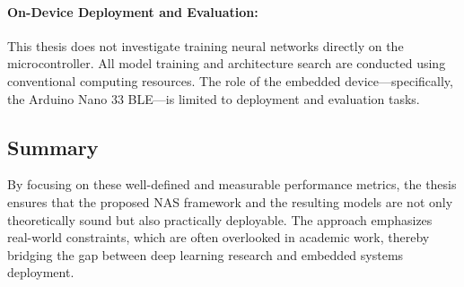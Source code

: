 \paragraph{\textbf{On-Device Deployment and Evaluation}:}
This thesis does not investigate training neural networks directly on the microcontroller. All model training and architecture search are conducted using conventional computing resources. The role of the embedded device—specifically, the Arduino Nano 33 BLE—is limited to deployment and evaluation tasks.

\begin{comment}
Deployment on the microcontroller serves two main purposes: (1) verifying that the models fit within the device’s memory limits (1~MB flash and 256~KB RAM), and (2) measuring the energy consumption during inference. It is important to note, however, that the actual available memory for model deployment is lower than the nominal specifications, due to system overhead and runtime allocations. Therefore, on-device deployment provides practical insight into the true usable memory budget available for models.

This approach reflects realistic usage scenarios, where microcontrollers are employed for energy-efficient inference under strict resource constraints, while the computationally intensive training phase is carried out off-device.
 
\end{comment}



\subsection{\textbf{Summary}}

By focusing on these well-defined and measurable performance metrics, the thesis ensures that the proposed NAS framework and the resulting models are not only theoretically sound but also practically deployable. The approach emphasizes real-world constraints, which are often overlooked in academic work, thereby bridging the gap between deep learning research and embedded systems deployment.


